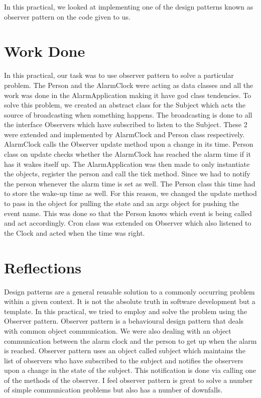 In this practical, we looked at implementing one of the design patterns known as observer pattern on the code given to us.

\section{Work Done}

In this practical, our task was to use observer pattern to solve a particular problem. The Person and the AlarmClock were acting as data classes and all the work was done in the AlarmApplication making it have god class tendencies. To solve this problem, we created an abstract class for the Subject which acts the source of broadcasting when something happens. The broadcasting is done to all the interface Observers which have subscribed to listen to the Subject. These 2 were extended and implemented by AlarmClock and Person class respectively. AlarmClock calls the Observer update method upon a change in its time. Person class on update checks whether the AlarmClock has reached the alarm time if it has it wakes itself up. The AlarmApplication was then made to only instantiate the objects, register the person and call the tick method. Since we had to notify the person whenever the alarm time is set as well. The Person class this time had to store the wake-up time as well. For this reason, we changed the update method to pass in the object for pulling the state and an args object for pushing the event name. This was done so that the Person knows which event is being called and act accordingly. Cron class was extended on Observer which also listened to the Clock and acted when the time was right.

\section{Reflections}

Design patterns are a general reusable solution to a commonly occurring problem within a given context. It is not the absolute truth in software development but a template. In this practical, we tried to employ and solve the problem using the Observer pattern. Observer pattern is a behavioural design pattern that deals with common object communication. We were also dealing with an object communication between the alarm clock and the person to get up when the alarm is reached. Observer pattern uses an object called subject which maintains the list of observers who have subscribed to the subject and notifies the observers upon a change in the state of the subject. This notification is done via calling one of the methods of the observer. I feel observer pattern is great to solve a number of simple communication problems but also has a number of downfalls.

